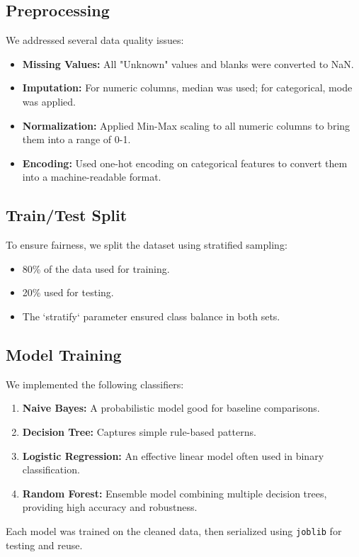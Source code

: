 \documentclass[conference]{IEEEtran}
\begin{document}
\subsection{Preprocessing}
We addressed several data quality issues:
\begin{itemize}
    \item \textbf{Missing Values:} All "Unknown" values and blanks were converted to NaN.
    \item \textbf{Imputation:} For numeric columns, median was used; for categorical, mode was applied.
    \item \textbf{Normalization:} Applied Min-Max scaling to all numeric columns to bring them into a range of 0-1.
    \item \textbf{Encoding:} Used one-hot encoding on categorical features to convert them into a machine-readable format.
\end{itemize}

\subsection{Train/Test Split}
To ensure fairness, we split the dataset using stratified sampling:
\begin{itemize}
    \item 80\% of the data used for training.
    \item 20\% used for testing.
    \item The `stratify` parameter ensured class balance in both sets.
\end{itemize}

\subsection{Model Training}
We implemented the following classifiers:
\begin{enumerate}
    \item \textbf{Naive Bayes:} A probabilistic model good for baseline comparisons.
    \item \textbf{Decision Tree:} Captures simple rule-based patterns.
    \item \textbf{Logistic Regression:} An effective linear model often used in binary classification.
    \item \textbf{Random Forest:} Ensemble model combining multiple decision trees, providing high accuracy and robustness.
\end{enumerate}

Each model was trained on the cleaned data, then serialized using \texttt{joblib} for testing and reuse.
\end{document}
